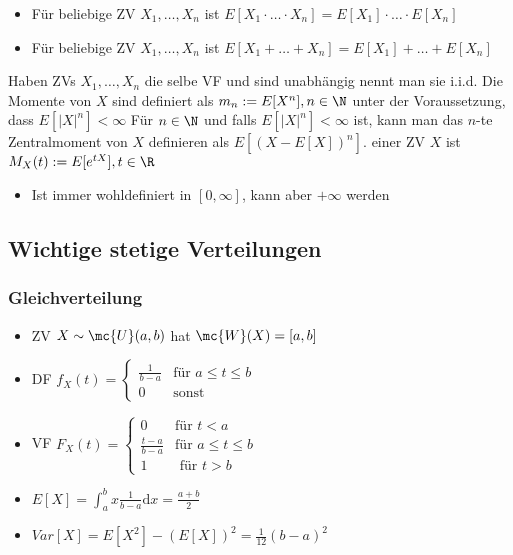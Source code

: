 \begin{itemize}
\begin{itemize}
            \item Für beliebige ZV $X_1, \dots, X_n$ ist $E[X_1 \cdot \dots \cdot X_n] = E[X_1] \cdot \dots \cdot E[X_n]$
            \item Für beliebige ZV $X_1, \dots, X_n$ ist $E[X_1 + \dots + X_n] = E[X_1] + \dots + E[X_n]$
        \end{itemize}
     Haben ZVs $X_1, \dots, X_n$ die selbe VF und sind unabhängig nennt man sie i.i.d.
     Die Momente von $X$ sind definiert als $m_n := E[X^n], n \in \N$ unter der Voraussetzung, dass $E[|X|^n] < \infty$
     Für $n \in \N$ und falls $E[|X|^n] < \infty$ ist, kann man das $n$-te Zentralmoment von $X$ definieren als $E[(X - E[X])^n]$.
     einer ZV $X$ ist $M_X(t) := E[e^{tX}], t \in \R$
        \begin{itemize}
            \item Ist immer wohldefiniert in $[0, \infty]$, kann aber $+\infty$ werden
        \end{itemize}
\end{itemize}

\subsection{Wichtige stetige Verteilungen}
\subsubsection{Gleichverteilung}
\begin{itemize}
    \item ZV $X \sim \mc{U}(a,b)$ hat $\mc{W}(X) = [a,b]$
    \item DF $f_X(t) =
\begin{cases}
    \frac{1}{b - a} &\text{für } a \le t \le b\\
    0 & \text{sonst}
\end{cases}$
    \item VF $F_X(t) =
\begin{cases}
    0 &\text{für } t < a\\
    \frac{t - a}{b - a} &\text{für } a \le t \le b\\
    1 &\text{ für } t > b
\end{cases}$
    \item $E[X] = \int_{a}^{b} x \frac{1}{b - a} \mathrm{d}x = \frac{a + b}{2}$
    \item $Var[X] = E[X^2] - (E[X])^2 = \frac{1}{12}(b - a)^2$
\end{itemize}

